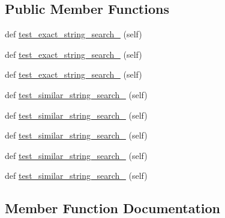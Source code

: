 \subsection*{Public Member Functions}
\begin{DoxyCompactItemize}
\item 
def \hyperlink{classpylinkvalidator_1_1_web_handy_tool_1_1tests_1_1search_test_a22af068c76d651d26ddec1e3570a6940}{test\+\_\+exact\+\_\+string\+\_\+search\+\_} (self)
\item 
def \hyperlink{classpylinkvalidator_1_1_web_handy_tool_1_1tests_1_1search_test_a6a143b588cd317e507c1036eb1cff74c}{test\+\_\+exact\+\_\+string\+\_\+search\+\_} (self)
\item 
def \hyperlink{classpylinkvalidator_1_1_web_handy_tool_1_1tests_1_1search_test_a812392a789426a4dfcaf6426969926a2}{test\+\_\+exact\+\_\+string\+\_\+search\+\_} (self)
\item 
def \hyperlink{classpylinkvalidator_1_1_web_handy_tool_1_1tests_1_1search_test_add0a85705a03e79c4f5cce6d3e561970}{test\+\_\+similar\+\_\+string\+\_\+search\+\_} (self)
\item 
def \hyperlink{classpylinkvalidator_1_1_web_handy_tool_1_1tests_1_1search_test_acd6db92558eb31dd8056ae2f78eb9a44}{test\+\_\+similar\+\_\+string\+\_\+search\+\_} (self)
\item 
def \hyperlink{classpylinkvalidator_1_1_web_handy_tool_1_1tests_1_1search_test_af29247a2451b8eb1bba4128d11894623}{test\+\_\+similar\+\_\+string\+\_\+search\+\_} (self)
\item 
def \hyperlink{classpylinkvalidator_1_1_web_handy_tool_1_1tests_1_1search_test_a4b8eb65b213a20cc9ffb5cceee0d3edd}{test\+\_\+similar\+\_\+string\+\_\+search\+\_} (self)
\item 
def \hyperlink{classpylinkvalidator_1_1_web_handy_tool_1_1tests_1_1search_test_af1b354dddca2b2e216ce2961126b69c4}{test\+\_\+similar\+\_\+string\+\_\+search\+\_} (self)
\end{DoxyCompactItemize}


\subsection{Member Function Documentation}
